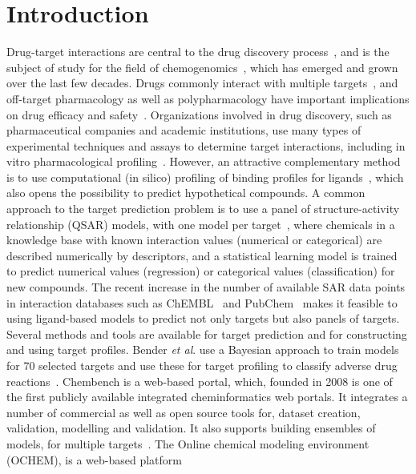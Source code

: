 \documentclass[utf8]{frontiersSCNS} %
\begin{document}
\section{Introduction} \label{Introduction}

Drug-target interactions are central to the drug discovery
process~\cite{Yildirim:2007vh}, and is the subject of study for the field of
chemogenomics~\cite{Bredel2004}, which has emerged and grown over the last
few decades. Drugs commonly interact with multiple
targets~\cite{hopkins2008network}, and off-target pharmacology as well as
polypharmacology have important implications on drug efficacy and
safety~\cite{Peters:2013yg,Ravikumar:2018qd}. Organizations involved in drug
discovery, such as pharmaceutical companies and academic institutions, use
many types of experimental techniques and assays to determine target
interactions, including in vitro pharmacological profiling~\cite{Bowes2012}.
However, an attractive complementary method is to use computational (in
silico) profiling of binding profiles for
ligands~\cite{Cereto-Massague:2015px}, which also opens the possibility to
predict hypothetical compounds. A common approach to the target prediction
problem is to use a panel of structure-activity relationship (QSAR) models,
with one model per target~\cite{HanschQSAR}, where chemicals in a knowledge
base with known interaction values (numerical or categorical) are described
numerically by descriptors, and a statistical learning model is trained to
predict numerical values (regression) or categorical values (classification)
for new compounds. The recent increase in the number of available SAR data
points in interaction databases such as ChEMBL~\cite{Gaulton:2017tm} and
PubChem~\cite{Wang:2017cy} makes it feasible to using ligand-based models to
predict not only targets but also panels of targets. Several methods and
tools are available for target prediction and for constructing and using
target profiles.
%
Bender \textit{et al}. use a Bayesian approach to train models for 70
selected targets and use these for target profiling to classify adverse drug
reactions~\cite{Bender:2007ib}.
%
Chembench is a web-based portal, which, founded in 2008 is one of the first
publicly available integrated cheminformatics web portals. It integrates a
number of commercial as well as open source tools for, dataset creation,
validation, modelling and validation. It also supports building ensembles of
models, for multiple targets~\cite{Walker2010,Capuzzi2017}.
%
The Online chemical modeling environment (OCHEM), is a web-based platform
\end{document}
